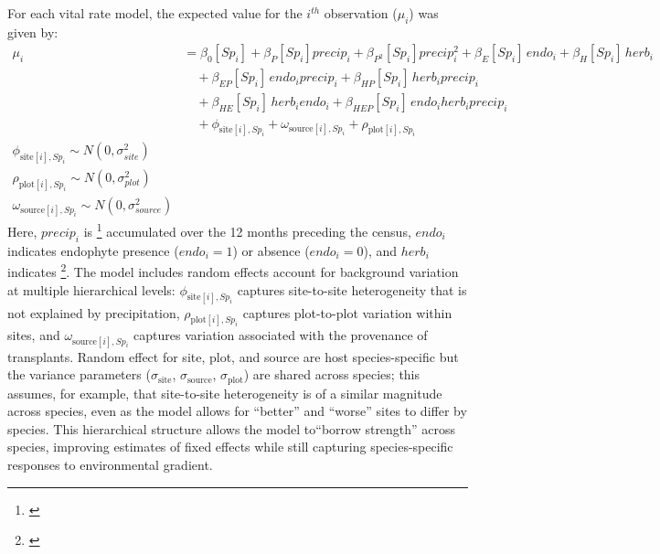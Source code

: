 \documentclass[12pt]{article}\usepackage[]{graphicx}\usepackage[dvipsnames]{xcolor}
\newcommand{\tom}[2]{{\color{red}{#1}}\footnote{\textit{\color{red}{#2}}}}
\begin{document}
For each vital rate model, the expected value for the $i^{th}$ observation ($\mu_{i}$) was given by:
\begin{equation}\label{eq:full_model}
\begin{aligned}
\mu_i &= \beta_0[Sp_i] + \beta_P[Sp_i] precip_i + \beta_{P^2}[Sp_i] precip_i^2 + \beta_{E}[Sp_i]\, endo_i + \beta_{H}[Sp_i]\, herb_i \\
&\quad + \beta_{EP}[Sp_i]\, endo_i precip_i 
       + \beta_{HP}[Sp_i]\, herb_i precip_i \\
&\quad + \beta_{HE}[Sp_i]\, herb_i endo_i + \beta_{HEP}[Sp_i]\, endo_i herb_i precip_i \\
&\quad  + \phi_{\text{site}[i],Sp_i} 
       + \omega_{\text{source}[i],Sp_i} 
       + \rho_{\text{plot}[i],Sp_i}
       \\
\phi_{\text{site}[i],Sp_i} \sim N(0,\sigma^2_{site})\\
\rho_{\text{plot}[i],Sp_i} \sim N(0,\sigma^2_{plot})\\
\omega_{\text{source}[i],Sp_i} \sim N(0,\sigma^2_{source})
\end{aligned}
\end{equation}
\noindent Here, $precip_i$ is \tom{total precipitation (mm)}{I think we should update FIgure 2 so that it shows precipitation of both years, since the combined effects of site and year is what gives us greater ppt coverage. Also, was ppt scaled to mean zero for analysis?} accumulated over the 12 months preceding the census, $endo_i$ indicates endophyte presence ($endo_i=1$) or absence ($endo_i=0$), and $herb_i$ indicates \tom{herbivore access ($herb_i=1$) or exclusion ($herb_i=0$)}{Is this right? We need to make sure we interest the fence effects correctly.}.
The model includes random effects account for background variation at multiple hierarchical levels: $\phi_{\text{site}[i],Sp_i}$ captures site-to-site heterogeneity that is not explained by precipitation, $\rho_{\text{plot}[i],Sp_i}$ captures plot-to-plot variation within sites, and $\omega_{\text{source}[i],Sp_i}$ captures variation associated with the provenance of transplants.
Random effect for site, plot, and source are host species-specific but the variance parameters ($\sigma_{\text{site}}$, $\sigma_{\text{source}}$, $\sigma_{\text{plot}}$) are shared across species; this assumes, for example, that site-to-site heterogeneity is of a similar magnitude across species, even as the model allows for ``better'' and ``worse'' sites to differ by species. 
This hierarchical structure allows the model to``borrow strength'' across species, improving estimates of fixed effects while still capturing species-specific responses to environmental gradient.
\end{document}
